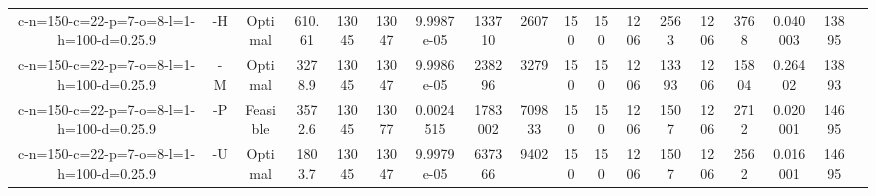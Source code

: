 \documentclass[landscape, a4paper]{article}
\begin{document}
\begin{center}
\begin{tabular}{@{}cccccccccccccccccc@{}}
c-n=150-c=22-p=7-o=8-l=1-h=100-d=0.25.9 & -H & Optimal & 610.61 & 13045 & 13047 & 9.9987e-05 & 133710 & 2607 & 150 & 150 & 1206 & 2563 & 1206 & 3768 & 0.040003 & 13895 & \\
c-n=150-c=22-p=7-o=8-l=1-h=100-d=0.25.9 & -M & Optimal & 3278.9 & 13045 & 13047 & 9.9986e-05 & 238296 & 3279 & 150 & 150 & 1206 & 13393 & 1206 & 15804 & 0.26402 & 13893 & \\
c-n=150-c=22-p=7-o=8-l=1-h=100-d=0.25.9 & -P & Feasible & 3572.6 & 13045 & 13077 & 0.0024515 & 1783002 & 709833 & 150 & 150 & 1206 & 1507 & 1206 & 2712 & 0.020001 & 14695 & \\
c-n=150-c=22-p=7-o=8-l=1-h=100-d=0.25.9 & -U & Optimal & 1803.7 & 13045 & 13047 & 9.9979e-05 & 637366 & 9402 & 150 & 150 & 1206 & 1507 & 1206 & 2562 & 0.016001 & 14695 & \\
\end{tabular}
\end{center}
\end{document}
